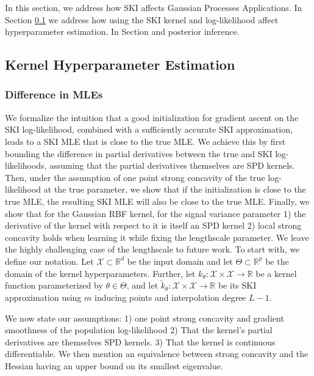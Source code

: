 In this section, we address how SKI affects Gaussian Processes Applications. In Section \ref{sec:kernel-hyperparameter-estimation} we address how using the SKI kernel and log-likelihood affect hyperparameter estimation. In Section and posterior inference.

\subsection{Kernel Hyperparameter Estimation}\label{sec:kernel-hyperparameter-estimation}

\subsubsection{Difference in MLEs}

We formalize the intuition that a good initialization for gradient ascent on the SKI log-likelihood, combined with a sufficiently accurate SKI approximation, leads to a SKI MLE that is close to the true MLE. We achieve this by first bounding the difference in partial derivatives between the true and SKI log-likelihoods, assuming that the partial derivatives themselves are SPD kernels. Then, under the assumption of one point strong concavity of the true log-likelihood at the true parameter, we show that if the initialization is close to the true MLE, the resulting SKI MLE will also be close to the true MLE. Finally, we show that for the Gaussian RBF kernel, for the signal variance parameter 1) the derivative of the kernel with respect to it is itself an SPD kernel 2) local strong concavity holds when learning it while fixing the lengthscale parameter. We leave the highly challenging case of the lengthscale to future work. To start with, we define our notation. Let $\mathcal{X} \subset \mathbb{R}^d$ be the input domain and let $\Theta \subset \mathbb{R}^p$ be the domain of the kernel hyperparameters. Further, let $k_{\theta}: \mathcal{X} \times \mathcal{X} \rightarrow \mathbb{R}$ be a kernel function parameterized by $\theta \in \Theta$, and let $\tilde{k}_{\theta}: \mathcal{X} \times \mathcal{X} \rightarrow \mathbb{R}$ be its SKI approximation using $m$ inducing points and interpolation degree $L-1$.

We now state our assumptions: 1) one point strong concavity and gradient smoothness of the population log-likelihood 2) That the kernel's partial derivatives are themselves SPD kernels. 3) That the kernel is continuous differentiable. We then mention an equivalence between strong concavity and the Hessian having an upper bound on its smallest eigenvalue.

